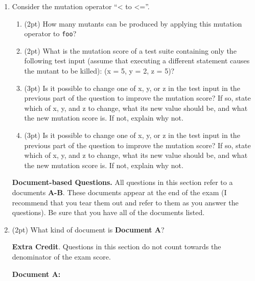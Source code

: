 \documentclass{report}
\newif\ifkey
\newcommand{\answershort}[1]{\ifkey\color{red}\underline{\textbf{#1}}\color{black}\else\underline{\hspace{3in}}\fi\xspace}
\newcommand{\answerlong}[1]{\ifkey\color{red}\textbf{#1}\color{black}\else\vspace{0.5in}\fi\xspace}
\newcommand*{\pts}[1]{\addtocounter{points}{#1}(#1pt)}
\begin{document}
\begin{spacing}{1.4}
\begin{enumerate}[leftmargin=*]
  \item \label{el1} Consider the mutation operator ``< to <=''.
    \begin{enumerate}
    \item \pts{2} How many mutants can be produced by applying this mutation operator
    to \lstinline$foo$?\\ \answershort{2}
    \item \pts{2} What is the mutation score of a test suite containing only the following test input (assume that executing a different statement causes the mutant to be killed):
    (x = 5, y = 2, z = 5)?\\ \answershort{0\%}
    \item \pts{3} Is it possible to change one of x, y, or z in the test input in the previous part of the question to improve the mutation score?
    If so, state which of x, y, and z to change, what its new value should be, and what the new mutation score is. If not, explain
    why not. \\
    \answerlong{z = 6 changes the mutation score to 50\%}
    \item \pts{3} Is it possible to change one of x, y, or z in the test input in the previous part of the question to improve the mutation score?
    If so, state which of x, y, and z to change, what its new value should be, and what the new mutation score is. If not, explain
    why not. \\
    \answerlong{It is not, because the second mutant is an equivalent mutant.}
    \end{enumerate}

    \newpage
    \textbf{Document-based Questions.} All questions in this section refer to a documents \textbf{A-B}.
    These documents appear at the end of the exam (I recommend that you tear them out and refer to them as you answer the questions).
    Be sure that you have all of the documents listed.

    \item \pts{2} What kind of document is \textbf{Document A}? \\ \answershort{postmortem}

    \newpage

    \textbf{Extra Credit}. Questions in this section do not count towards the denominator of the exam score.

    \newpage

    \textbf{Document A:}
    

\end{enumerate}
\end{spacing}
\end{document}
